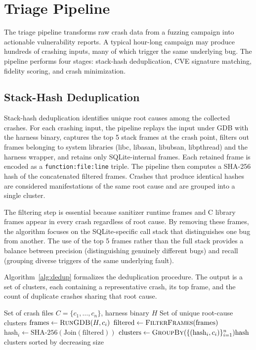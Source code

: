 \section{Triage Pipeline}
\label{sec:triage}

The triage pipeline transforms raw crash data from a fuzzing campaign into actionable vulnerability reports. A typical hour-long campaign may produce hundreds of crashing inputs, many of which trigger the same underlying bug. The pipeline performs four stages: stack-hash deduplication, CVE signature matching, fidelity scoring, and crash minimization.

\subsection{Stack-Hash Deduplication}

Stack-hash deduplication identifies unique root causes among the collected crashes. For each crashing input, the pipeline replays the input under GDB with the harness binary, captures the top 5 stack frames at the crash point, filters out frames belonging to system libraries (libc, libasan, libubsan, libpthread) and the harness wrapper, and retains only SQLite-internal frames. Each retained frame is encoded as a \texttt{function:file:line} triple. The pipeline then computes a SHA-256 hash of the concatenated filtered frames. Crashes that produce identical hashes are considered manifestations of the same root cause and are grouped into a single cluster.

The filtering step is essential because sanitizer runtime frames and C library frames appear in every crash regardless of root cause. By removing these frames, the algorithm focuses on the SQLite-specific call stack that distinguishes one bug from another. The use of the top 5 frames rather than the full stack provides a balance between precision (distinguishing genuinely different bugs) and recall (grouping diverse triggers of the same underlying fault).

Algorithm~\ref{alg:dedup} formalizes the deduplication procedure. The output is a set of clusters, each containing a representative crash, its top frame, and the count of duplicate crashes sharing that root cause.

\begin{algorithm}[htbp]
\caption{Stack-Hash Crash Deduplication}
\label{alg:dedup}
\begin{algorithmic}[1]
\Require Set of crash files $C = \{c_1, \ldots, c_n\}$, harness binary $H$
\Ensure Set of unique root-cause clusters
    \State $\text{frames} \gets \Call{RunGDB}{H, c_i}$ 
    \State $\text{filtered} \gets \Call{FilterFrames}{\text{frames}}$ 
    \State $\text{hash}_i \gets \text{SHA-256}(\text{Join}(\text{filtered}))$
\EndFor
\State $\text{clusters} \gets \Call{GroupBy}{\{(\text{hash}_i, c_i)\}_{i=1}^n}{\text{hash}}$
\State \Return clusters sorted by decreasing size
\end{algorithmic}
\end{algorithm}

